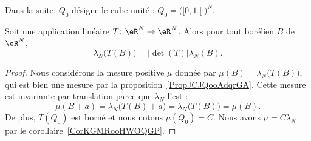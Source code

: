 Dans la suite, \( Q_0\) désigne le cube unité : \( Q_0=\big( \mathopen[ 0 , 1 \mathclose[ \big)^N\).

\begin{theorem}    \label{ThoBVIJooMkifod}
    Soit une application linéaire \( T\colon \eR^N\to \eR^N\). Alors pour tout borélien \( B\) de \( \eR^N\),
    \begin{equation}
        \lambda_N\big( T(B) \big)=| \det(T) |\lambda_N(B).
    \end{equation}
\end{theorem}

\begin{proof}
    Nous considérons la mesure positive \( \mu\) donnée par \( \mu(B)=\lambda_N\big( T(B) \big)\), qui est bien une mesure par la proposition~\ref{PropJCJQooAdqrGA}. Cette mesure est invariante par translation parce que \( \lambda_N\) l'est :
    \begin{equation}
        \mu(B+a)=\lambda_N\big( T(B)+a \big)=\lambda_N\big( T(B) \big)=\mu(B).
    \end{equation}
    De plus, \( T(Q_0)\) est borné et nous notons \( \mu(Q_0)=C\). Nous avons \( \mu=C\lambda_N\) par le corollaire~\ref{CorKGMRooHWOQGP}.


\end{proof}
